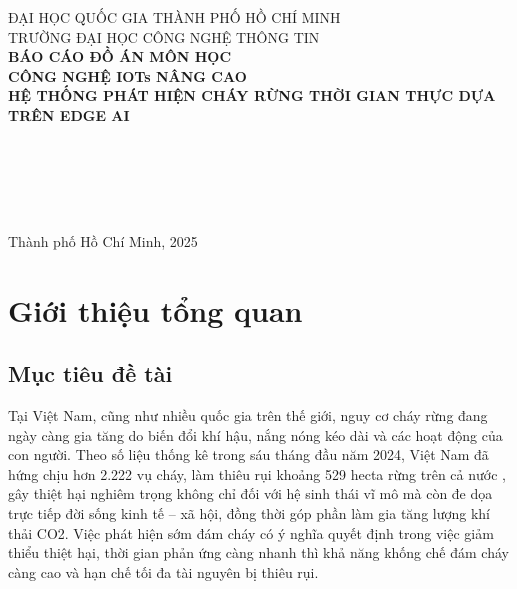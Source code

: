 \documentclass[12pt,a4paper]{report}
\begin{document}
\begin{titlepage}
  \centering
  {\large ĐẠI HỌC QUỐC GIA THÀNH PHỐ HỒ CHÍ MINH}\\[0.3cm]
  {\large TRƯỜNG ĐẠI HỌC CÔNG NGHỆ THÔNG TIN}\\[2cm]

  {\Large \textbf{BÁO CÁO ĐỒ ÁN MÔN HỌC}}\\[0.3cm]
  {\large \textbf{CÔNG NGHỆ IOTs NÂNG CAO}}\\[1cm]
  {\Large \textbf{HỆ THỐNG PHÁT HIỆN CHÁY RỪNG THỜI GIAN THỰC DỰA TRÊN EDGE AI}}\\[2cm]

  \begin{flushleft}
  \hspace{3cm}{\large Sinh viên thực hiện:}\\[0.3cm]
  \\[0.2cm]
  \\[0.8cm]
  \\[2cm]
  \end{flushleft}

  \vfill
  {\large Thành phố Hồ Chí Minh, 2025}
\end{titlepage}

\tableofcontents
\listoffigures
\listoftables

\clearpage
{}

\chapter{Giới thiệu tổng quan}

\section{Mục tiêu đề tài}

Tại Việt Nam, cũng như nhiều quốc gia trên thế giới, nguy cơ cháy rừng đang ngày càng gia tăng do biến đổi khí hậu, nắng nóng kéo dài và các hoạt động của con người. Theo số liệu thống kê trong sáu tháng đầu năm 2024, Việt Nam đã hứng chịu hơn 2.222 vụ cháy, làm thiêu rụi khoảng 529 hecta rừng trên cả nước \cite{vov2024wildfire}, gây thiệt hại nghiêm trọng không chỉ đối với hệ sinh thái vĩ mô mà còn đe dọa trực tiếp đời sống kinh tế -- xã hội, đồng thời góp phần làm gia tăng lượng khí thải CO2. Việc phát hiện sớm đám cháy có ý nghĩa quyết định trong việc giảm thiểu thiệt hại, thời gian phản ứng càng nhanh thì khả năng khống chế đám cháy càng cao và hạn chế tối đa tài nguyên bị thiêu rụi.
\end{document}
